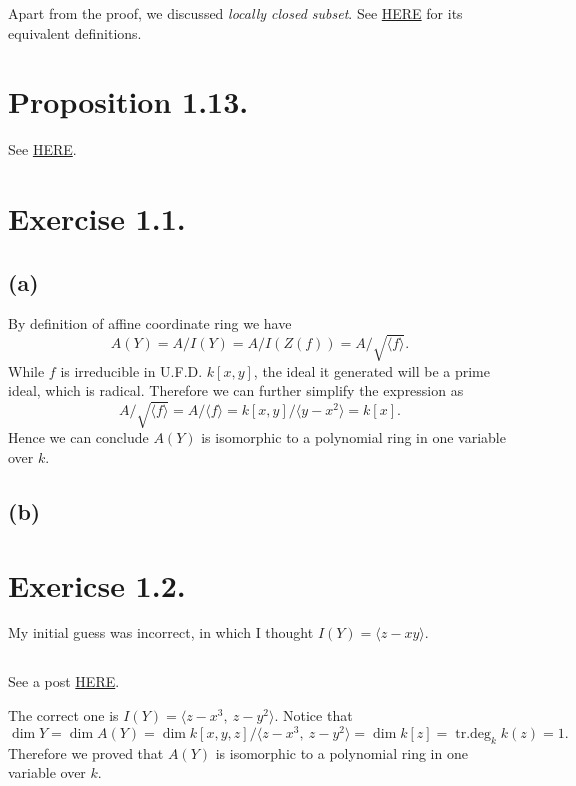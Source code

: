 Apart from the proof, we discussed \textit{locally closed subset}.
See \href{https://en.wikipedia.org/wiki/Locally_closed_subset}{HERE} for its equivalent definitions.

\section{Proposition 1.13.}

See \href{https://math.stackexchange.com/questions/1292811/help-with-proposition-1-13-in-hartshornes-algebraic-geometry}{HERE}.

\section{Exercise 1.1.}

\subsection{(a)}

By definition of affine coordinate ring we have 
\[A(Y)=A/I(Y)=A/I(Z(f))=A/\sqrt{\langle f\rangle}.\]
While $f$ is irreducible in U.F.D. $k[x,y]$, the ideal it generated will be a prime ideal, which is radical. Therefore we can further simplify the expression as 
\[A/\sqrt{\langle f\rangle}=A/\langle f\rangle=k[x,y]/\langle y-x^2\rangle=k[x].\]
Hence we can conclude $A(Y)$ is isomorphic to a polynomial ring in one variable over $k$.

\subsection{(b)}

\section{Exericse 1.2.}

My initial guess was incorrect, in which I thought $I(Y)=\langle z-xy\rangle$.

\subsection{}

See a post \href{https://math.stackexchange.com/questions/1864637/the-affine-coordinate-ring-of-twisted-cubic-curve-y-is-ay-kx-y-z-z-x3}{HERE}.

The correct one is $I(Y)=\langle z-x^3,~ z-y^2\rangle$.
Notice that \[\operatorname{dim}Y=\operatorname{dim}A(Y)=\operatorname{dim}k[x,y,z]/\langle z-x^3,~ z-y^2\rangle=\operatorname{dim}k[z]=\operatorname{tr.deg}_k k(z)=1.\]
Therefore we proved that $A(Y)$ is isomorphic to a polynomial ring in one variable over $k$.

